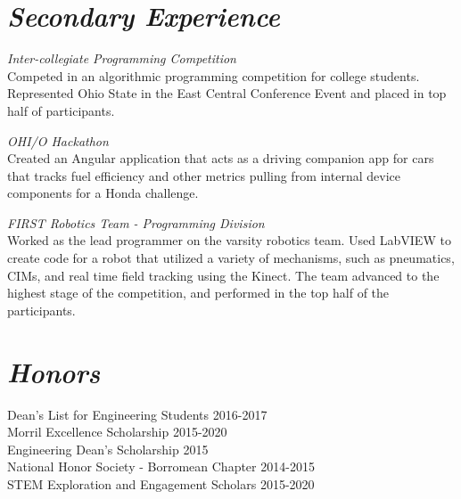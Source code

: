 \documentclass[]{res}
\begin{document}
{			
			\section{\sl  \textbf{Secondary Experience}}
			
			\textit{Inter-collegiate Programming Competition}\\
			Competed in an algorithmic programming competition for college students. Represented Ohio State in the East Central Conference Event and placed in top half of participants.
			
			\textit{OHI/O Hackathon}\\
			Created an Angular application that acts as a driving companion app for cars that tracks fuel efficiency and other metrics pulling from internal device components for a Honda challenge.
			
			\textit{FIRST Robotics Team - Programming Division}\\
			Worked as the lead programmer on the varsity robotics team. Used LabVIEW to create code for a robot that utilized a variety of mechanisms, such as pneumatics, CIMs, and real time field tracking using the Kinect.
			The team advanced to the highest stage of the competition, and performed in the top half of the participants.

			\section{\sl \textbf{Honors}}	
			Dean's List for Engineering Students  \hfill 2016-2017 \\
			Morril Excellence Scholarship   \hfill  2015-2020 \\
			Engineering Dean's Scholarship  \hfill  2015 \\
			National Honor Society - Borromean Chapter \hfill  2014-2015 \\
			STEM Exploration and Engagement Scholars \hfill  2015-2020 
		
	}
		
\end{document}
